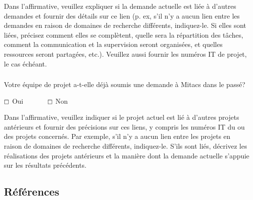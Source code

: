 \documentclass{mitacs-acceleration}
\begin{document}
\begin{instructions}
Dans l'affirmative, veuillez expliquer si la demande actuelle est liée à d'autres demandes et fournir des détails sur ce lien (p. ex, s'il n'y a aucun lien entre les demandes en raison de domaines de recherche différents, indiquez-le. Si elles sont liées, précisez comment elles se complètent, quelle sera la répartition des tâches, comment la communication et la supervision seront organisées, et quelles ressources seront partagées, etc.). Veuillez aussi fournir les numéros IT de projet, le cas échéant.
\end{instructions}


\subsubsection{} Votre équipe de projet a-t-elle déjà soumis une demande à Mitacs dans le passé?

$\boxempty$ Oui~~~~~~~$\boxempty$ Non

\begin{instructions}
Dans l'affirmative, veuillez indiquer si le projet actuel est lié à d'autres projets antérieurs et fournir des précisions sur ces liens, y compris les numéros IT du ou des projets concernés. Par exemple, s'il n'y a aucun lien entre les projets en raison de domaines de recherche différents, indiquez-le. S'ils sont liés, décrivez les réalisations des projets antérieurs et la manière dont la demande actuelle s'appuie sur les résultats précédents.
\end{instructions}


\subsection{Références} %




\end{document}
